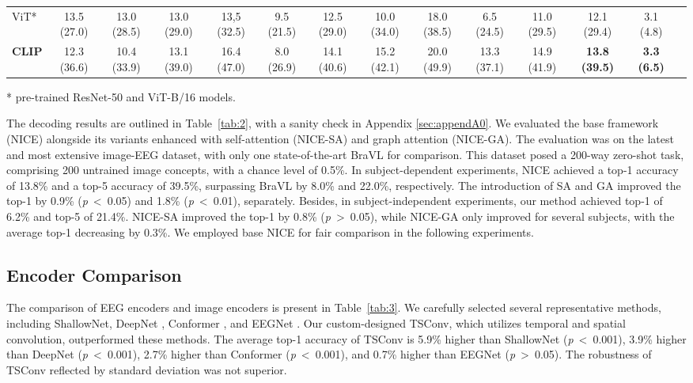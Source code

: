 \begin{table}[t]
{\begin{threeparttable}
\begin{tabular}{lccccccccccccc}
    ViT* & 13.5 (27.0) & 13.0 (28.5) & 13.0 (29.0) & 13,5 (32.5) & 9.5 (21.5) & 12.5 (29.0) & 10.0 (34.0) & 18.0 (38.5) & 6.5 (24.5) & 11.0 (29.5) & 12.1 (29.4) & 3.1 (4.8) \\
    \rowcolor{green!10} \textbf{CLIP} & 12.3 (36.6) & 10.4 (33.9) & 13.1 (39.0) & 16.4 (47.0) & 8.0 (26.9) & 14.1 (40.6) & 15.2 (42.1) & 20.0 (49.9) & 13.3 (37.1) & 14.9 (41.9) & \textbf{13.8 (39.5)} & \textbf{3.3 (6.5)} \\
    \bottomrule
  \end{tabular}
      \begin{tablenotes}
        \item[*] pre-trained ResNet-50 and ViT-B/16 models.  
    \end{tablenotes}
\end{threeparttable}}
\end{table}
The decoding results are outlined in Table~\ref{tab:2}, with a sanity check in Appendix \ref{sec:appendA0}. 
We evaluated the base framework (NICE) alongside its variants enhanced with self-attention (NICE-SA) and graph attention (NICE-GA).
The evaluation was on the latest and most extensive image-EEG dataset, with only one state-of-the-art BraVL \citep{du2023decoding} for comparison.
This dataset posed a 200-way zero-shot task, comprising 200 untrained image concepts, with a chance level of 0.5\%.
In subject-dependent experiments, NICE achieved a top-1 accuracy of 13.8\% and a top-5 accuracy of 39.5\%, surpassing BraVL by 8.0\% and 22.0\%, respectively. 
The introduction of SA and GA improved the top-1 by 0.9\% (\textit{p}\ \textless\ 0.05) and 1.8\% (\textit{p}\ \textless\ 0.01), separately.
Besides, in subject-independent experiments, our method achieved top-1 of 6.2\% and top-5 of 21.4\%.
NICE-SA improved the top-1 by 0.8\% (\textit{p}\ \textgreater\ 0.05), while NICE-GA only improved for several subjects, with the average top-1 decreasing by 0.3\%.
We employed base NICE for fair comparison in the following experiments.

\subsection{Encoder Comparison}
The comparison of EEG encoders and image encoders is present in Table~\ref{tab:3}.
We carefully selected several representative methods, including ShallowNet, DeepNet \citep{schirrmeister2017deepa}, Conformer \citep{song2023eega}, and EEGNet \citep{lawhern2018eegneta}.
Our custom-designed TSConv, which utilizes temporal and spatial convolution, outperformed these methods.
The average top-1 accuracy of TSConv is 5.9\% higher than ShallowNet (\textit{p}\ \textless\ 0.001), 3.9\% higher than DeepNet (\textit{p}\ \textless\ 0.001), 2.7\% higher than Conformer (\textit{p}\ \textless\ 0.001), and  0.7\% higher than EEGNet (\textit{p}\ \textgreater\ 0.05).
The robustness of TSConv reflected by standard deviation was not superior.

